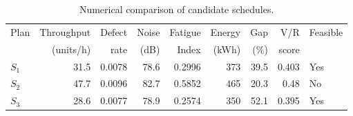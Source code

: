 \begin{table}[htbp]
\centering
\caption{Numerical comparison of candidate schedules.}
\label{tab:numerical-sim}
\small
\begin{tabular}{@{}lrrrrrrrl@{}}
\toprule
Plan & Throughput & Defect & Noise & Fatigue & Energy & Gap & V/R & Feasible \\
     & (units/h)  & rate   & (dB)  & Index   & (kWh)  & (\%) & score &         \\
\midrule
$S_{1}$ & 31.5 & 0.0078 & 78.6 & 0.2996 & 373 & 39.5 & 0.403 & Yes \\
$S_{2}$ & 47.7 & 0.0096 & 82.7 & 0.5852 & 465 & 20.3 & 0.48 & No \\
$S_{3}$ & 28.6 & 0.0077 & 78.9 & 0.2574 & 350 & 52.1 & 0.395 & Yes \\
\bottomrule
\end{tabular}
\end{table}
